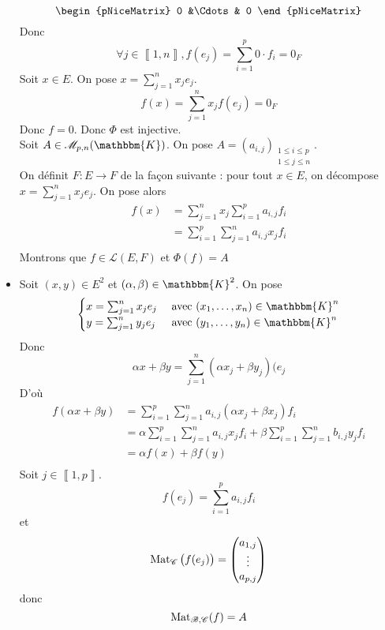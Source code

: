 \begin{prv}
\begin{itemize}
\[\begin{pNiceMatrix}
					0 &\Cdots& 0
				\end{pNiceMatrix}
			\] %
			Donc \[
				\forall j \in \left\llbracket 1,n \right\rrbracket, f(e_j) = \sum_{i=1}^p 0 \cdot f_i = 0_F
			\] Soit $x \in E$. On pose $x = \sum_{j=1}^n x_j e_j$. \[
				f(x) = \sum_{j=1}^n x_j f(e_j) = 0_F
			\] Donc $f = 0$. Donc $\Phi$ est injective.\\
			Soit $A \in \mathcal{M}_{p,n}(\mathbbm{K})$. On pose $A = (a_{i,j})_{\substack{1\le i\le p\\1\le j\le n}}$.\\
			On définit $F : E \to  F$ de la façon suivante : pour tout $x \in E$, on décompose $x = \sum_{j=1}^n x_j e_j$. On pose alors
			\begin{align*}
				f(x) &= \sum_{j=1}^n x_j \sum_{i=1}^p a_{i,j}f_i \\
				&= \sum_{i=1}^p \sum_{j=1}^n a_{i,j} x_j f_i \\
			\end{align*} Montrons que $f \in \mathcal{L}(E,F)$ et $\Phi(f) = A$ 
		\item Soit $(x,y) \in E^2$ et $(\alpha, \beta) \in \mathbbm{K}^2$. On pose \[
				\begin{cases}
					x = \sum_{j=1}^n x_j e_j &\text{ avec } (x_1, \ldots, x_n) \in \mathbbm{K}^n\\
					y = \sum_{j=1}^n y_j e_j &\text{ avec } (y_1, \ldots, y_n) \in \mathbbm{K}^n\\
				\end{cases}
			\] Donc \[
				\alpha x + \beta y = \sum_{j=1}^n (\alpha x_j + \beta y_j)(e_j
			\] D'où
			\begin{align*}
				f(\alpha x + \beta y) &= \sum_{i=1}^p \sum_{j=1}^n a_{i,j}(\alpha x_j + \beta x_j)f_i \\
				&= \alpha \sum_{i=1}^p \sum_{j=1}^n a_{i,j} x_j f_i + \beta \sum_{i=1}^p \sum_{j=1}^n b_{i,j} y_j f_i \\
				&= \alpha f(x) + \beta f(y) \\
			\end{align*}
			Soit $j \in \left\llbracket 1,p \right\rrbracket$. \[
				f(e_j) = \sum_{i=1}^p a_{i,j}f_i
			\] et \[
				\operatorname{Mat}_{\mathcal{C}}\big(f(e_j)\big) = \begin{pmatrix}
					a_{1,j}\\
					\vdots\\
					a_{p,j}
				\end{pmatrix} 
			\] donc \[
				\operatorname{Mat}_{\mathcal{B},\mathcal{C}}(f) = A
			\]
	\end{itemize}
\end{prv}

